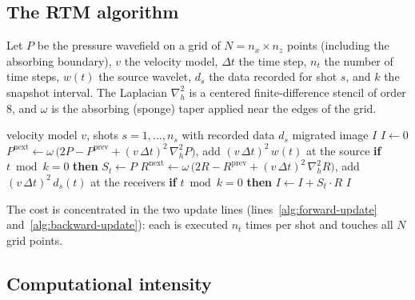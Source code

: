 \documentclass[letterpaper,11pt,leqno]{article}
\begin{document}
\subsection{The RTM algorithm}

Let $P$ be the pressure wavefield on a grid of $N = n_x \times n_z$ points (including the absorbing boundary), $v$ the velocity model, $\Delta t$ the time step, $n_t$ the number of time steps, $w(t)$ the source wavelet, $d_s$ the data recorded for shot $s$, and $k$ the snapshot interval. The Laplacian $\nabla_h^2$ is a centered finite-difference stencil of order 8, and $\omega$ is the absorbing (sponge) taper applied near the edges of the grid.

\begin{algorithm}[!htb]
\caption{Shot-profile Reverse Time Migration with a zero-lag cross-correlation
imaging condition}
\label{alg:rtm}
\begin{algorithmic}[1]
\Require velocity model $v$, shots $s = 1,\dots,n_s$ with recorded data $d_s$
\Ensure migrated image $I$
\State $I \gets 0$
     
        \State $P^{\mathrm{next}} \gets \omega\,\bigl(2P - P^{\mathrm{prev}}
               + (v\,\Delta t)^2\,\nabla_h^2 P\bigr)$, add $(v\,\Delta t)^2\,w(t)$ at the source
               \label{alg:forward-update}
        \State \textbf{if} $t \bmod k = 0$ \textbf{then} $S_{t} \gets P$ 
    \EndFor
     
        \State $R^{\mathrm{next}} \gets \omega\,\bigl(2R - R^{\mathrm{prev}}
               + (v\,\Delta t)^2\,\nabla_h^2 R\bigr)$, add $(v\,\Delta t)^2\,d_s(t)$ at the receivers
               \label{alg:backward-update}
        \State \textbf{if} $t \bmod k = 0$ \textbf{then} $I \gets I + S_{t} \cdot R$ 
    \EndFor
\EndFor
\State \Return $I$
\end{algorithmic}
\end{algorithm}

The cost is concentrated in the two update lines (lines~\ref{alg:forward-update} and~\ref{alg:backward-update}): each is executed $n_t$ times per shot and touches all $N$ grid points.

\subsection{Computational intensity}
\end{document}
